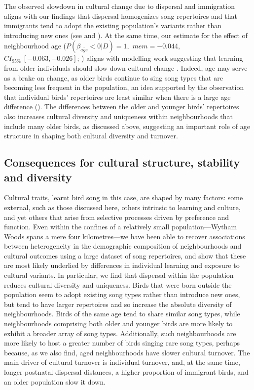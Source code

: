 \documentclass[9pt, onecolumn, twoside, lineno]{gsajnl}
\begin{document}
The observed slowdown in cultural change due to dispersal and immigration aligns with our findings that dispersal homogenizes song repertoires and that immigrants tend to adopt the existing population's variants rather than introducing new ones (see  and ). At the same time, our estimate for the effect of neighbourhood age ($P(\beta_{\overline{age}} < 0 | D) = 1,$ $mem=-0.044,$ $CI_{95\%}~[-0.063, -0.026]$; ) aligns with modelling work suggesting that learning from older individuals should slow down cultural change \autocite{kirby2021}. Indeed, age may serve as a brake on change, as older birds continue to sing song types that are becoming less frequent in the population, an idea supported by the observation that individual birds' repertoires are least similar when there is a large age difference (). The differences between the older and younger birds' repertoires also increases cultural diversity and uniqueness within neighbourhoods that include many older birds, as discussed above, suggesting an important role of age structure in shaping both cultural diversity and turnover.

\subsection{Consequences for cultural structure, stability and diversity}

Cultural traits, learnt bird song in this case, are shaped by many factors: some external, such as those discussed here, others intrinsic to learning and culture, and yet others that arise from selective processes driven by preference and function. Even within the confines of a relatively small population---Wytham Woods spans a mere four kilometres---we have been able to recover associations between heterogeneity in the demographic composition of neighbourhoods and cultural outcomes using a large dataset of song repertoires, and show that these are most likely underlied by differences in individual learning and exposure to cultural variants. In particular, we find that dispersal within the population reduces cultural diversity and uniqueness. Birds that were born outside the population seem to adopt existing song types rather than introduce new ones, but tend to have larger repertoires and so increase the absolute diversity of neighbourhoods. Birds of the same age tend to share similar song types, while neighbourhoods comprising both older and younger birds are more likely to exhibit a broader array of song types. Additionally, such neighbourhoods are more likely to host a greater number of birds singing rare song types, perhaps because, as we also find, aged neighbourhoods have slower cultural turnover. The main driver of cultural turnover is individual turnover, and, at the same time, longer postnatal dispersal distances, a higher proportion of immigrant birds, and an older population slow it down. 
\end{document}
